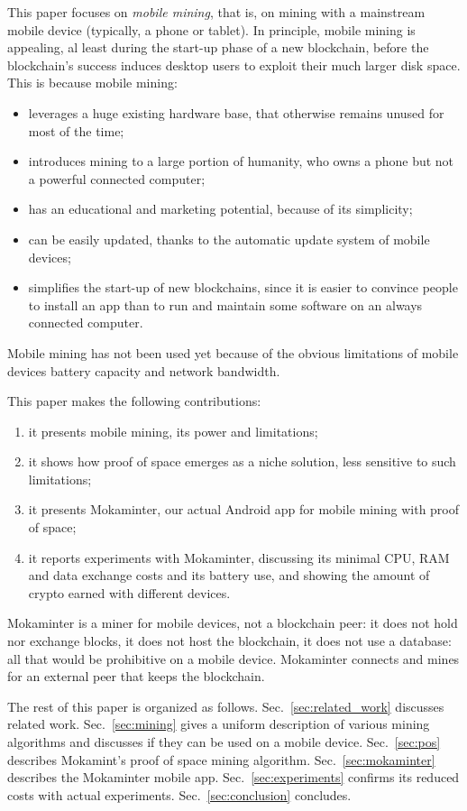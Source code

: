 This paper focuses on \emph{mobile mining}, that is,
on mining with a mainstream mobile device (typically, a phone or tablet).
In principle, mobile mining is appealing,
al least during the start-up phase of a new blockchain, before
the blockchain's success induces desktop users to exploit their much larger disk space.
This is because mobile mining:
%
\begin{itemize}
\item leverages a huge existing hardware base, that otherwise remains unused
  for most of the time;
\item introduces mining to a large portion of humanity, who owns a
  phone but not a powerful connected computer;
\item has an educational and marketing potential, because of its simplicity;
\item can be easily updated, thanks to the automatic update system of mobile devices;
\item simplifies the start-up of new blockchains, since it is easier to convince people
  to install an app than to run and maintain some software on an always connected computer.
\end{itemize}
%
Mobile mining has not been used yet because of the obvious limitations
of mobile devices \wrt{} battery capacity and network bandwidth.

This paper makes the following contributions:
%
\begin{enumerate}
\item it presents mobile mining, its power and limitations;
\item it shows how proof of space emerges as a niche solution, less sensitive
  to such limitations;
\item it presents Mokaminter, our actual Android app for mobile mining with proof of space;
\item it reports experiments with Mokaminter, discussing its minimal CPU, RAM and data exchange costs
  and its battery use, and showing the amount of crypto earned with different devices.
\end{enumerate}
%
Mokaminter is a miner for mobile devices, not a blockchain
peer: it does not hold nor exchange blocks, it does not host the blockchain,
it does not use a database: all that would be prohibitive on a mobile device.
Mokaminter connects and mines for an external peer that keeps the blockchain.

The rest of this paper is organized as follows.
Sec.~\ref{sec:related_work} discusses related work.
Sec.~\ref{sec:mining} gives a uniform description of various mining algorithms and
discusses if they can be used on a mobile device.
Sec.~\ref{sec:pos} describes Mokamint's proof of space mining algorithm.
Sec.~\ref{sec:mokaminter} describes the Mokaminter mobile app.
Sec.~\ref{sec:experiments} confirms its reduced costs with actual experiments.
Sec.~\ref{sec:conclusion} concludes.
